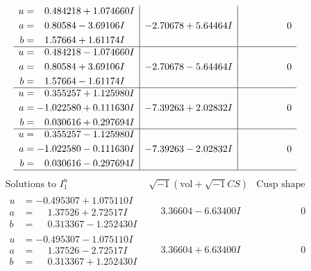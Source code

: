 \documentclass[1p]{elsarticle_modified}
\theoremstyle{definition}
\newcommand{\I}{\sqrt{-1}}
\begin{document}
$$\begin{array}{c|c|c}
\begin{aligned}
u &= \phantom{-}0.484218 + 1.074660 I \\
a &= \phantom{-}0.80584 - 3.69106 I \\
b &= \phantom{-}1.57664 + 1.61174 I\end{aligned}
 & -2.70678 + 5.64464 I & \phantom{-0.000000 } 0 \\ \hline\begin{aligned}
u &= \phantom{-}0.484218 - 1.074660 I \\
a &= \phantom{-}0.80584 + 3.69106 I \\
b &= \phantom{-}1.57664 - 1.61174 I\end{aligned}
 & -2.70678 - 5.64464 I & \phantom{-0.000000 } 0 \\ \hline\begin{aligned}
u &= \phantom{-}0.355257 + 1.125980 I \\
a &= -1.022580 + 0.111630 I \\
b &= \phantom{-}0.030616 + 0.297694 I\end{aligned}
 & -7.39263 + 2.02832 I & \phantom{-0.000000 } 0 \\ \hline\begin{aligned}
u &= \phantom{-}0.355257 - 1.125980 I \\
a &= -1.022580 - 0.111630 I \\
b &= \phantom{-}0.030616 - 0.297694 I\end{aligned}
 & -7.39263 - 2.02832 I & \phantom{-0.000000 } 0\\
 \hline 
 \end{array}$$\newpage$$\begin{array}{c|c|c}  
\text{Solutions to }I^u_{1}& \I (\text{vol} + \sqrt{-1}CS) & \text{Cusp shape}\\
 \hline 
\begin{aligned}
u &= -0.495307 + 1.075110 I \\
a &= \phantom{-}1.37526 + 2.72517 I \\
b &= \phantom{-}0.313367 - 1.252430 I\end{aligned}
 & \phantom{-}3.36604 - 6.63400 I & \phantom{-0.000000 } 0 \\ \hline\begin{aligned}
u &= -0.495307 - 1.075110 I \\
a &= \phantom{-}1.37526 - 2.72517 I \\
b &= \phantom{-}0.313367 + 1.252430 I\end{aligned}
 & \phantom{-}3.36604 + 6.63400 I & \phantom{-0.000000 } 0 \\ \hline\begin{aligned}

\end{aligned}
\end{array}$$
\end{document}
